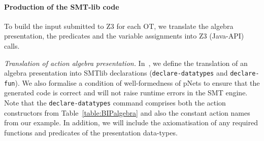 \documentclass[smallcondensed]{svjour3}
\newcommand{\noteSB}[2][color=green!40, size=\tiny]{\todo[#1]{{\bf Simon: } {#2}}}
\begin{document}

\paragraph{Production of the SMT-lib code}
  To build the input submitted to Z3 for each OT,
we translate the algebra presentation, the predicates and the
variable assignments into Z3 (Java-API) calls.

\emph{Translation of action algebra presentation.}
In~\cite{AVOCS18}, we  define the translation of an algebra presentation into
SMTlib declarations (\texttt{declare-datatypes} and
\texttt{declare-fun}). We also formalise a condition of well-formedness of pNets to ensure that the generated code is correct
and will not raise runtime errors in the SMT engine. Note that the
\texttt{declare-datatypes} command comprises both the action
constructors from Table~\ref{table:BIPalgebra} and also the constant action
names from our example.
In addition, we will include the axiomatisation of any required functions
and predicates of the presentation data-types.


\end{document}
